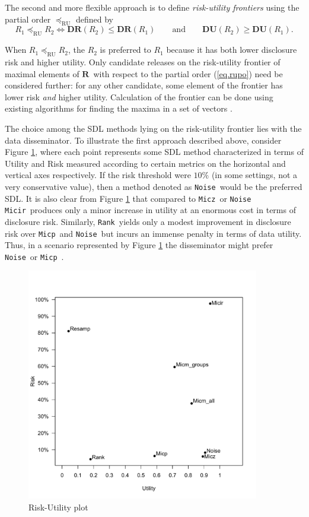 \documentclass[12pt]{article}
\def\DR{\ensuremath{\mathbf{DR}}} %
\def\DU{\ensuremath{\mathbf{DU}}} %
\def\RS{\ensuremath{\mathbf{R}}} %
\def\NOI{{\tt Noise}}
\def\MICZ{{\tt Micz}}
\def\MICP{{\tt Micp}}
\def\MICI{{\tt Micir}}
\def\RANK{{\tt Rank}}
\begin{document}
The second and more flexible approach is to define \textit{risk-utility
frontiers} using the partial order $\preceq_{\mathrm{RU}}$ defined
by
\begin{equation}\label{eq.rupo}
R_1 \preceq_{\mathrm{RU}} R_2 \Leftrightarrow \DR(R_2) \leq
\DR(R_1) \qquad\mbox{and}\qquad \DU(R_2) \geq \DU(R_1).
\end{equation}

When $R_1 \preceq_{\mathrm{RU}} R_2$, the $R_2$ is preferred to
$R_1$ because it has both lower disclosure risk and higher
utility. Only candidate releases on the risk-utility frontier of
maximal elements of \RS\ with respect to the partial order
(\ref{eq.rupo}) need be considered further: for any other
candidate, some element of the frontier has lower risk
\textit{and} higher utility. Calculation of the frontier can be
done using existing algorithms for finding the maxima in a set of
vectors \citep{kung-luccio-preparata75}. 


The choice among the SDL methods lying on the risk-utility
frontier lies with the data disseminator. To illustrate the first approach
described above, consider Figure \ref{fig.ruplot}, where each point
represents some SDL method characterized in terms of Utility and Risk 
measured according to certain metrics on the horizontal and vertical axes respectively.
If the risk threshold were $10\%$ (in some settings, not a very conservative value), 
then a method denoted as \NOI\ would be the preferred SDL. It is also clear from Figure \ref{fig.ruplot} that compared to \MICZ\ or \NOI\, \MICI\ produces only a minor increase
in utility at an enormous cost in terms of disclosure risk. Similarly,
\RANK\ yields only a modest improvement in disclosure
risk over \MICP\ and \NOI\, but incurs an immense
penalty in terms of data utility. Thus, in a scenario represented by Figure \ref{fig.ruplot}
 the disseminator  might prefer \NOI\ or \MICP\ .

\begin{figure}
\begin{center}
\includegraphics[width=4in]{R_U_plot.pdf}
\end{center}
\caption{Risk-Utility plot}
\label{fig.ruplot}
\end{figure}
\end{document}
